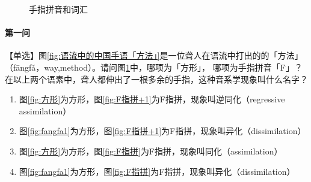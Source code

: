 \documentclass[12pt, a4paper, oneside]{ctexart}
\begin{document}
\begin{figure}[H]
    \centering
    \centering
    \caption{手指拼音和词汇}
    \label{fig:手指拼音和词汇}
\end{figure}

\paragraph{第一问}
【单选】图\ref{fig:语流中的中国手语「方法」}是一位聋人在语流中打出的的「方法」（fāngfǎ，way,method）。请问图\ref{fig:手指拼音和词汇}中，哪项为「方形」，
哪项为手指拼音「F」？在以上两个语素中，聋人都伸出了一根多余的手指，这种音系学现象叫什么名字？

\begin{enumerate}[label=\Alph*.]
    \item 图\ref{fig:方形}为方形，图\ref{fig:F指拼+1}为F指拼，现象叫逆同化（regressive assimilation）
    \item 图\ref{fig:fangfa1}为方形，图\ref{fig:F指拼+1}为F指拼，现象叫异化（dissimilation）
    \item 图\ref{fig:方形}为方形，图\ref{fig:F指拼}为F指拼，现象叫同化（assimilation）
    \item 图\ref{fig:fangfa1}为方形，图\ref{fig:F指拼}为F指拼，现象叫异化（dissimilation）
\end{enumerate}
\end{document}

